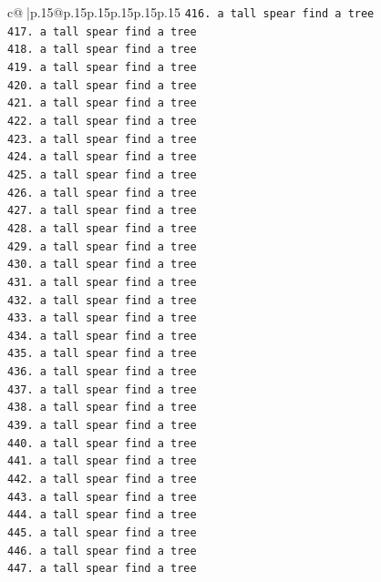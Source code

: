 \documentclass{article}
\begin{document}
{\begin{supertabular}{c@{$\;$}|p{.15\linewidth}@{}p{.15\linewidth}p{.15\linewidth}p{.15\linewidth}p{.15\linewidth}p{.15\linewidth}}
{{{\texttt{416. a tall spear find a tree} \\
\texttt{417. a tall spear find a tree} \\
\texttt{418. a tall spear find a tree} \\
\texttt{419. a tall spear find a tree} \\
\texttt{420. a tall spear find a tree} \\
\texttt{421. a tall spear find a tree} \\
\texttt{422. a tall spear find a tree} \\
\texttt{423. a tall spear find a tree} \\
\texttt{424. a tall spear find a tree} \\
\texttt{425. a tall spear find a tree} \\
\texttt{426. a tall spear find a tree} \\
\texttt{427. a tall spear find a tree} \\
\texttt{428. a tall spear find a tree} \\
\texttt{429. a tall spear find a tree} \\
\texttt{430. a tall spear find a tree} \\
\texttt{431. a tall spear find a tree} \\
\texttt{432. a tall spear find a tree} \\
\texttt{433. a tall spear find a tree} \\
\texttt{434. a tall spear find a tree} \\
\texttt{435. a tall spear find a tree} \\
\texttt{436. a tall spear find a tree} \\
\texttt{437. a tall spear find a tree} \\
\texttt{438. a tall spear find a tree} \\
\texttt{439. a tall spear find a tree} \\
\texttt{440. a tall spear find a tree} \\
\texttt{441. a tall spear find a tree} \\
\texttt{442. a tall spear find a tree} \\
\texttt{443. a tall spear find a tree} \\
\texttt{444. a tall spear find a tree} \\
\texttt{445. a tall spear find a tree} \\
\texttt{446. a tall spear find a tree} \\
\texttt{447. a tall spear find a tree} \\
}}}
\end{supertabular}}
\end{document}
